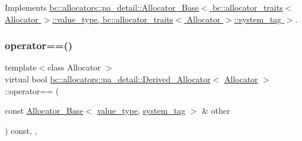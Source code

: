 Implements \hyperlink{structbc_1_1allocators_1_1pa__detail_1_1Allocator__Base_a02eb1291b28c3d83c53f973df47b9caa}{bc\+::allocators\+::pa\+\_\+detail\+::\+Allocator\+\_\+\+Base$<$ bc\+::allocator\+\_\+traits$<$ Allocator $>$\+::value\+\_\+type, bc\+::allocator\+\_\+traits$<$ Allocator $>$\+::system\+\_\+tag $>$}.

\mbox{\label{structbc_1_1allocators_1_1pa__detail_1_1Derived__Allocator_ad4aa49cda67ab382b2e91225dc3d8b36}} 
\subsubsection{\texorpdfstring{operator==()}{operator==()}}
{\footnotesize\ttfamily template$<$class Allocator $>$ \\
virtual bool \hyperlink{structbc_1_1allocators_1_1pa__detail_1_1Derived__Allocator}{bc\+::allocators\+::pa\+\_\+detail\+::\+Derived\+\_\+\+Allocator}$<$ \hyperlink{classbc_1_1allocators_1_1Allocator}{Allocator} $>$\+::operator== (\begin{DoxyParamCaption}\item[{const \hyperlink{structbc_1_1allocators_1_1pa__detail_1_1Allocator__Base}{Allocator\+\_\+\+Base}$<$ \hyperlink{structbc_1_1allocators_1_1pa__detail_1_1Derived__Allocator_a997c60e64ca7028da4c9eb15b5bf553d}{value\+\_\+type}, \hyperlink{structbc_1_1allocators_1_1pa__detail_1_1Derived__Allocator_a42f99505929fa39c067d186f5f623045}{system\+\_\+tag} $>$ \&}]{other }\end{DoxyParamCaption}) const\hspace{0.3cm}{\ttfamily [inline]}, {\ttfamily [override]}, {\ttfamily [virtual]}}

\mbox{\label{structbc_1_1allocators_1_1pa__detail_1_1Derived__Allocator_a167659ce0c822b659fbd6ff3ced83876}} 
